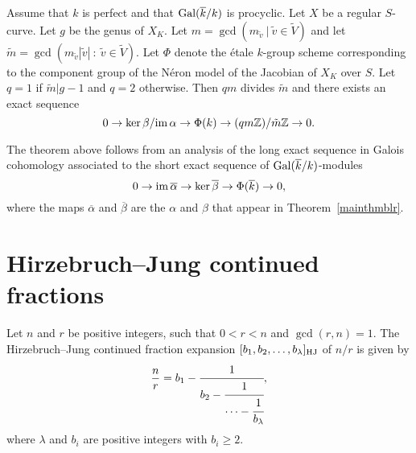 \begin{thm}\label{galcoh}\cite[Theorem~1.17, Corollary~1.17]{bosliu}
Assume that $k$ is perfect and that $\operatorname{Gal} (\overline{k}/k)$ is procyclic. Let $X$ be a regular $S$-curve. Let $g$ be the genus of $X_K$. Let $m = \gcd(m_{\tilde{v}} \ | \ {\tilde{v} \in \widetilde{V}})$ and let $\tilde{m} = \gcd(m_{\tilde{v}}|\tilde{v}| \ : \ {\tilde{v} \in \widetilde{V}})$. Let $\Phi$ denote the \'{e}tale $k$-group scheme corresponding to the component group of the N\'{e}ron model of the Jacobian of $X_K$ over $S$. Let $q = 1$ if $\tilde{m} | g-1 $ and $q=2$ otherwise. Then $qm$ divides $\tilde{m}$ and there exists an exact sequence
\begin{equation}\label{tam}
 0 \rightarrow \ker{\beta}/{\operatorname{im}{\alpha}} \rightarrow \Phi(k) \rightarrow (qm \mathbb Z)/\tilde{m} \mathbb Z \rightarrow 0 .
\end{equation} 
\end{thm}
\begin{rmk}
The theorem above follows from an analysis of the long exact sequence in Galois cohomology associated to the short exact sequence of $\operatorname{Gal}(\overline{k}/k)$-modules
\[ 0 \rightarrow \operatorname{im}{\overline{\alpha}} \rightarrow \ker{\overline{\beta}} \rightarrow \Phi(\overline{k}) \rightarrow 0, \]
where the maps $\overline{\alpha}$ and $\overline{\beta}$ are the $\alpha$ and $\beta$ that appear in Theorem~\ref{mainthmblr}. 
\end{rmk}

\section{Hirzebruch--Jung continued fractions}\label{hj}
Let $n$ and $r$ be positive integers, such that $0 < r < n$ and $\gcd(r,n) = 1$. The Hirzebruch--Jung continued fraction expansion $[b_1,b_2,\ldots,b_{\lambda}]_{\textup{HJ}}$ of $n/r$ is given by
\begin{equation*}
  \frac{n}{r} = b_1 - \cfrac{1}{b_2 
          - \cfrac{1}{ \cdots - \cfrac{1}{b_\lambda} } },
\end{equation*}
where $\lambda$ and $b_i$ are positive integers with $b_i \geq 2$. 

